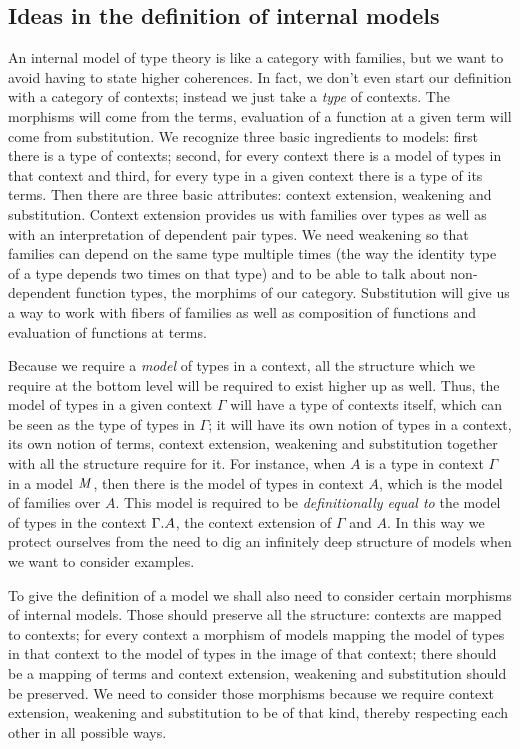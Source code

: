 \subsection{Ideas in the definition of internal models}
An internal model of type theory is like a category with families, but we want
to avoid having to state higher coherences. In fact, we don't even start our
definition with a category of contexts; instead we just take a \emph{type} of contexts. 
The morphisms will come from the terms, evaluation of a function at a given
term will come from substitution. We recognize three basic ingredients to models:
first there is a type of contexts; second, for every context there is a model of types in
that context and third, for every type in a given context there is a type of its
terms. Then there are three basic attributes: context extension, weakening and
substitution. Context extension provides us with families over types as well as
with an interpretation of dependent pair types. We need weakening 
so that families can depend on the same type multiple times (the way the
identity type of a type depends two times on that type) and to be able
to talk about non-dependent function types,
the morphims of our category. Substitution will give us a way
to work with fibers of families as well as composition of functions and evaluation
of functions at terms.

Because we require a \emph{model} of types in a context, all the structure
which we require at the bottom level will be required to exist higher up as well.
Thus, the model of types in a given context $\Gamma$ will have a type of contexts
itself, which can be seen as the type of types in $\Gamma$; it will have its
own notion of types in a context, its own notion of terms, context extension,
weakening and substitution together with all the structure require for it. For
instance, when $A$ is a type in context $\Gamma$ in a model $\mathit{M}$, then there
is the model of types in context $A$, which is the model of families over $A$. 
This model is required to be \emph{definitionally equal to} the model of types
in the context $\ctxext{\Gamma}{A}$, the context extension of $\Gamma$ and $A$.
In this way we protect ourselves from the need to dig an infinitely deep structure
of models when we want to consider examples.

To give the definition of a model we shall also need to consider certain morphisms
of internal models. Those should preserve all the structure: contexts are mapped
to contexts; for every context a morphism of models mapping the model of types
in that context to the model of types in the image of that context; there should
be a mapping of terms and context extension, weakening and substitution should be
preserved. We need to consider those morphisms because we require context extension,
weakening and substitution to be of that kind, thereby respecting each other
in all possible ways.

